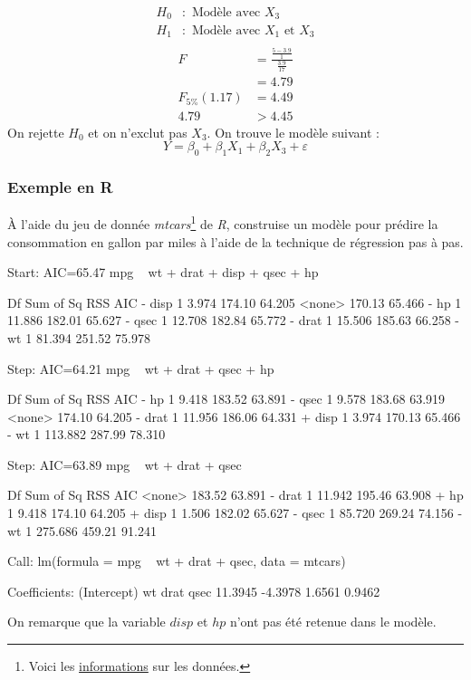 \documentclass[11pt,french]{report}
\begin{document}
\begin{align*}
H_0 &: \text{ Modèle avec $X_3$} \\
H_1 &: \text{ Modèle avec $X_1$ et $X_3$} \\
\end{align*}
\begin{align*}
F &= \frac{\frac{5 - 3.9}{1}}{\frac{3.9}{17}} \\
&= 4.79 \\
F_{5 \%}(1.17) &= 4.49 \\
4.79 &> 4.45
\end{align*}
On rejette $H_0$ et on n'exclut pas $X_3$. \newline
On trouve le modèle suivant :
$$
Y = \beta_0 + \beta_1X_1 + \beta_2X_3 + \varepsilon
$$

\subsubsection*{Exemple en R}
À l'aide du jeu de donnée \emph{mtcars}\footnote{Voici les \href{https://stat.ethz.ch/R-manual/R-devel/library/datasets/html/mtcars.html}{informations} sur les données.} de \emph{R}, construise un modèle pour prédire la consommation en gallon par miles à l'aide de la technique de régression pas à pas. 
\begin{Schunk}
\begin{Soutput}
Start:  AIC=65.47
mpg ~ wt + drat + disp + qsec + hp

       Df Sum of Sq    RSS    AIC
- disp  1     3.974 174.10 64.205
<none>              170.13 65.466
- hp    1    11.886 182.01 65.627
- qsec  1    12.708 182.84 65.772
- drat  1    15.506 185.63 66.258
- wt    1    81.394 251.52 75.978

Step:  AIC=64.21
mpg ~ wt + drat + qsec + hp

       Df Sum of Sq    RSS    AIC
- hp    1     9.418 183.52 63.891
- qsec  1     9.578 183.68 63.919
<none>              174.10 64.205
- drat  1    11.956 186.06 64.331
+ disp  1     3.974 170.13 65.466
- wt    1   113.882 287.99 78.310

Step:  AIC=63.89
mpg ~ wt + drat + qsec

       Df Sum of Sq    RSS    AIC
<none>              183.52 63.891
- drat  1    11.942 195.46 63.908
+ hp    1     9.418 174.10 64.205
+ disp  1     1.506 182.02 65.627
- qsec  1    85.720 269.24 74.156
- wt    1   275.686 459.21 91.241

Call:
lm(formula = mpg ~ wt + drat + qsec, data = mtcars)

Coefficients:
(Intercept)           wt         drat         qsec  
    11.3945      -4.3978       1.6561       0.9462  
\end{Soutput}
\end{Schunk}
On remarque que la variable $disp$ et $hp$ n'ont pas été retenue dans le modèle.
\end{document}
